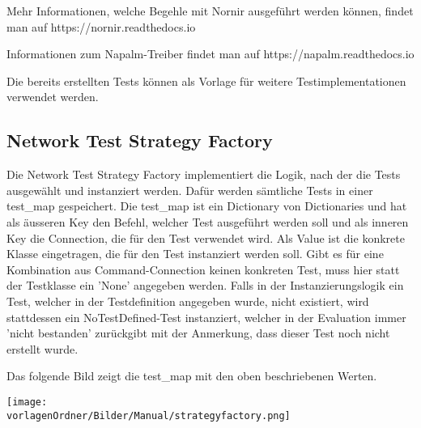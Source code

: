 \documentclass[
	ngerman,
	toc=listof, %
	toc=bibliography, %
	footnotes=multiple, %
	parskip=half, %
	numbers=noendperiod %
]{scrartcl}
\newcommand{\vorlagenOrdner}{../99_Vorlagen} %
\begin{document}
		Mehr Informationen, welche Begehle mit Nornir ausgeführt werden können, findet man 
		auf https://nornir.readthedocs.io

		Informationen zum Napalm-Treiber findet man auf https://napalm.readthedocs.io

		Die bereits erstellten Tests können als Vorlage für weitere Testimplementationen verwendet 
		werden.
		
	\subsection{Network Test Strategy Factory}
		Die Network Test Strategy Factory implementiert die Logik, nach der die Tests ausgewählt 
		und instanziert werden.
		Dafür werden sämtliche Tests in einer test\_map gespeichert. 
		Die test\_map ist ein Dictionary von Dictionaries und hat als äusseren Key 
		den Befehl, welcher Test ausgeführt werden soll und als inneren Key die Connection,
		die für den Test verwendet wird. 
		Als Value ist die konkrete Klasse eingetragen, die für den Test instanziert werden soll.
		Gibt es für eine Kombination aus Command-Connection keinen konkreten Test, 
		muss hier statt der Testklasse ein 'None' angegeben werden. 
		Falls in der Instanzierungslogik ein Test, welcher in der Testdefinition angegeben wurde,
		nicht existiert, wird stattdessen ein NoTestDefined-Test instanziert, welcher 
		in der Evaluation immer 'nicht bestanden' zurückgibt mit der Anmerkung, dass dieser
		Test noch nicht erstellt wurde.

		Das folgende Bild zeigt die test\_map mit den oben beschriebenen Werten.

		\texttt{[image: \\vorlagenOrdner/Bilder/Manual/strategyfactory.png]}
\end{document}
